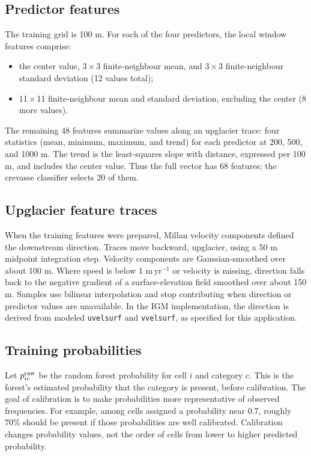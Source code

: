 \documentclass[11pt,a4paper]{article}
\begin{document}
\subsection{Predictor features}
The training grid is 100 m. For each of the four predictors, the local window
features comprise:
\begin{itemize}
  \item the center value, 3\,$\times$\,3 finite-neighbour mean, and 3\,$\times$\,3 finite-neighbour standard deviation (12 values total);
  \item 11\,$\times$\,11 finite-neighbour mean and standard deviation, excluding the center (8 more values).
\end{itemize}
The remaining 48 features summarize values along an upglacier trace: four
statistics (mean, minimum, maximum, and trend) for each predictor at 200, 500,
and 1000 m. The trend is the least-squares slope with distance, expressed per
100 m, and includes the center value. Thus the full vector has 68 features;
the crevasse classifier selects 20 of them.

\subsection{Upglacier feature traces}
When the training features were prepared, Millan velocity components defined
the downstream direction. Traces move backward, upglacier, using a 50 m
midpoint integration step. Velocity components are Gaussian-smoothed over
about 100 m. Where speed is below 1 m\,yr$^{-1}$ or velocity is missing,
direction falls back to the negative gradient of a surface-elevation field
smoothed over about 150 m. Samples use bilinear interpolation and stop
contributing when direction or predictor values are unavailable. In the IGM
implementation, the direction is derived from modeled \texttt{uvelsurf} and
\texttt{vvelsurf}, as specified for this application.

\subsection{Training probabilities}
Let $p_{ic}^{\rm raw}$ be the random forest probability for cell $i$ and
category $c$. This is the forest's estimated probability that the category is
present, before calibration. The goal of calibration is to make probabilities
more representative of observed frequencies. For example, among cells assigned
a probability near 0.7, roughly 70\% should be present if those probabilities
are well calibrated. Calibration changes probability values, not the order of
cells from lower to higher predicted probability.
\end{document}
